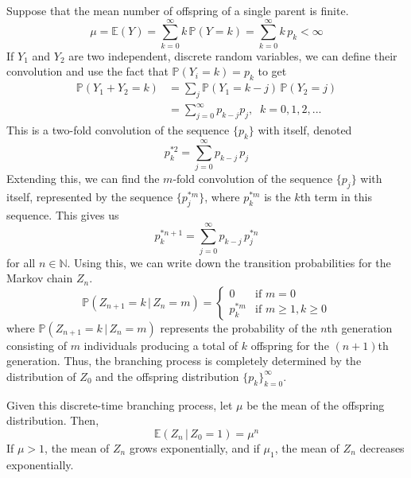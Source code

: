 \documentclass{article}
\begin{document}
      Suppose that the mean number of offspring of a single parent is finite. 
      \begin{equation}
        \mu = \mathbb{E}(Y) = \sum_{k=0}^\infty k \, \mathbb{P}(Y = k) = \sum_{k=0}^\infty k \, p_k < \infty
      \end{equation}
      If $Y_1$ and $Y_2$ are two independent, discrete random variables, we can define their convolution and use the fact that $\mathbb{P}(Y_i = k) = p_k$ to get
      \begin{align*}
        \mathbb{P}(Y_1 + Y_2 = k) & = \sum_j \mathbb{P}(Y_1 = k - j) \, \mathbb{P}(Y_2 = j) \\
        & = \sum_{j=0}^\infty p_{k-j} p_j, \;\; k = 0, 1, 2, ...
      \end{align*}
      This is a two-fold convolution of the sequence $\{p_k\}$ with itself, denoted
      \begin{equation}
        p_k^{*2} = \sum_{j=0}^\infty p_{k-j} \, p_j
      \end{equation}
      Extending this, we can find the $m$-fold convolution of the sequence $\{p_j\}$ with itself, represented by the sequence $\{p_j^{*m}\}$, where $p_k^{*m}$ is the $k$th term in this sequence. This gives us
      \begin{equation}
        p_k^{*n+1} = \sum_{j=0}^\infty p_{k-j} \, p_j^{*n}
      \end{equation}
      for all $n \in \mathbb{N}$. Using this, we can write down the transition probabilities for the Markov chain $Z_n$. 
      \begin{equation}
        \mathbb{P}(Z_{n+1} = k \, | \, Z_n = m) = \begin{cases}
        0 & \text{if } m = 0 \\
        p_k^{*m} & \text{if } m \geq 1, k \geq 0
        \end{cases}
      \end{equation}
      where $\mathbb{P}(Z_{n+1} = k \, | \, Z_n = m)$ represents the probability of the $n$th generation consisting of $m$ individuals producing a total of $k$ offspring for the $(n+1)$th generation. Thus, the branching process is completely determined by the distribution of $Z_0$ and the offspring distribution $\{p_k\}_{k=0}^\infty$. 

      \begin{lemma}
        Given this discrete-time branching process, let $\mu$ be the mean of the offspring distribution. Then, 
        \begin{equation}
          \mathbb{E}(Z_n \, | \, Z_0 = 1) = \mu^n
        \end{equation}
        If $\mu > 1$, the mean of $Z_n$ grows exponentially, and if $\mu_1$, the mean of $Z_n$ decreases exponentially. 
      \end{lemma}
\end{document}
